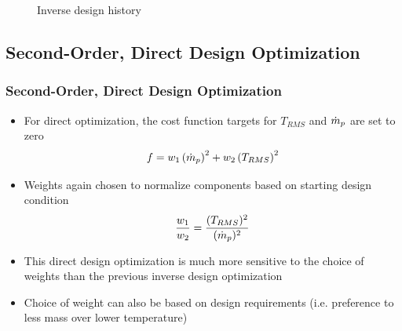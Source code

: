 \documentclass{beamer}
\begin{document}
\begin{frame}
{\begin{figure}
  \centering
  \caption{Inverse design history}
\end{figure}
}
\end{frame}

\subsection{Second-Order, Direct Design Optimization}

\begin{frame}
  \frametitle{Second-Order, Direct Design Optimization}
  \begin{itemize}
    \item For direct optimization, the cost function targets for $T_{RMS}$ and
      $\dot{m}_p$ are set to zero
      \[
        f = w_1\left( \dot{m}_p \right)^2 
          + w_2\left( T_{RMS} \right)^2
      \]
    \item Weights again chosen to normalize components based on starting design
      condition
      \[
        \frac{w_1}{w_2} = \frac{(T_{RMS})^2}{(\dot{m}_p)^2}
      \]
    \item This direct design optimization is much more sensitive to the choice of
      weights than the previous inverse design optimization
    \item Choice of weight can also be based on design requirements (i.e.
      preference to less mass over lower temperature)
  \end{itemize}
\end{frame}
\end{document}
